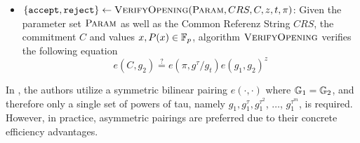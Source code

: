 \begin{itemize}
\item $\{\mathtt{accept},\mathtt{reject}\}\leftarrow \textsc{VerifyOpening}(\textsc{Param}, CRS,C,z,t,\pi)$: Given the parameter set $\textsc{Param}$ as well as the Common Referenz String $CRS$, the commitment $C$ and values $x,P(x)\in \mathbb{F}_p$, algorithm $\textsc{VerifyOpening}$ verifies the following equation
\begin{equation}
e(C,g_2) \stackrel{?}{=} e(\pi,g^{\tau}/g_t)e(g_1,g_2)^{z}
\end{equation}
\end{itemize} 

\begin{remark}
In \citep{kate-10}, the authors utilize a symmetric bilinear pairing $e(\cdot,\cdot)$ where $\mathbb{G}_1=\mathbb{G}_2$, and therefore only a single set of powers of tau, namely $g_1,g_1^\tau, g_1^{\tau^2}$, $\ldots$, $g_1^{\tau^m}$, is required. However, in practice, asymmetric pairings are preferred due to their concrete efficiency advantages.
\end{remark}